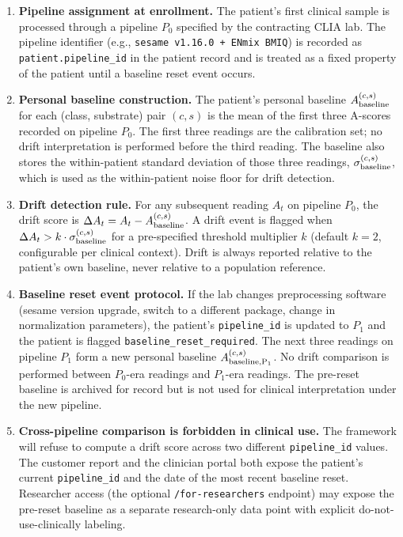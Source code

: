 \documentclass[12pt,a4paper]{article}
\begin{document}
\begin{enumerate}
\item \textbf{Pipeline assignment at enrollment.} The patient's first
clinical sample is processed through a pipeline $P_0$ specified by the
contracting CLIA lab. The pipeline identifier (e.g.,
\texttt{sesame v1.16.0 + ENmix BMIQ}) is recorded as
\texttt{patient.pipeline\_id} in the patient record and is treated as
a fixed property of the patient until a baseline reset event occurs.
\item \textbf{Personal baseline construction.} The patient's personal
baseline $A_{\rm baseline}^{(c,s)}$ for each (class, substrate) pair
$(c,s)$ is the mean of the first three A-scores recorded on pipeline
$P_0$. The first three readings are the calibration set; no drift
interpretation is performed before the third reading. The baseline
also stores the within-patient standard deviation of those three
readings, $\sigma_{\rm baseline}^{(c,s)}$, which is used as the
within-patient noise floor for drift detection.
\item \textbf{Drift detection rule.} For any subsequent reading $A_t$
on pipeline $P_0$, the drift score is
$\Delta A_t = A_t - A_{\rm baseline}^{(c,s)}$. A drift event is flagged
when $\Delta A_t > k \cdot \sigma_{\rm baseline}^{(c,s)}$ for a
pre-specified threshold multiplier $k$ (default $k = 2$, configurable
per clinical context). Drift is always reported relative to the
patient's own baseline, never relative to a population reference.
\item \textbf{Baseline reset event protocol.} If the lab changes
preprocessing software (sesame version upgrade, switch to a different
package, change in normalization parameters), the patient's
\texttt{pipeline\_id} is updated to $P_1$ and the patient is flagged
\texttt{baseline\_reset\_required}. The next three readings on
pipeline $P_1$ form a new personal baseline
$A_{\rm baseline,P_1}^{(c,s)}$. No drift comparison is performed
between $P_0$-era readings and $P_1$-era readings. The pre-reset
baseline is archived for record but is not used for clinical
interpretation under the new pipeline.
\item \textbf{Cross-pipeline comparison is forbidden in clinical use.}
The framework will refuse to compute a drift score across two
different \texttt{pipeline\_id} values. The customer report and the
clinician portal both expose the patient's current
\texttt{pipeline\_id} and the date of the most recent baseline reset.
Researcher access (the optional \texttt{/for-researchers} endpoint)
may expose the pre-reset baseline as a separate research-only data
point with explicit do-not-use-clinically labeling.
\end{enumerate}
\end{document}
